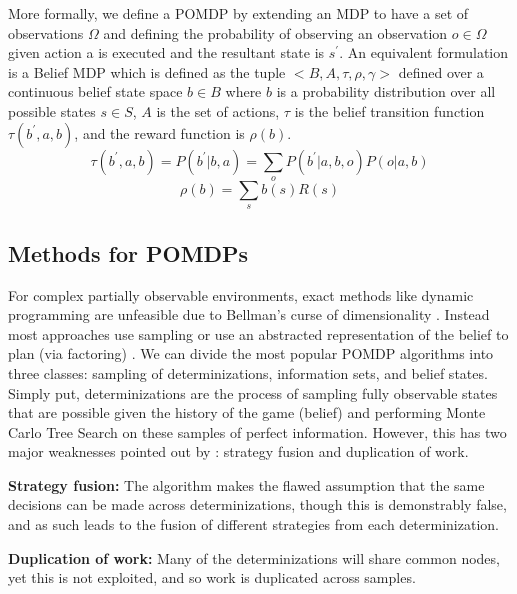 \documentclass[msc, deptreport, ai, romanprepages]{infthesis}
\begin{document}
More formally, we define a POMDP by extending an MDP to have a set of observations \(\Omega\) and defining the probability of observing an observation \(o \in \Omega\) given action a is executed and the resultant state is \(s^\prime\). An equivalent formulation is a Belief MDP which is defined as the tuple \(<B,A,\tau,\rho,\gamma>\) defined over a continuous belief state space \(b\in B\) where \(b\) is a probability distribution over all possible states \(s\in S\), \(A\) is the set of actions, \(\tau\) is the belief transition function \(\tau(b^\prime,a,b)\), and the reward function is \(\rho (b)\).
\begin{equation}
\tau(b^\prime,a,b) = P(b^\prime|b,a) = \sum_o P(b^\prime|a,b,o)P(o|a,b)
\end{equation}
\begin{equation}
\rho(b) = \sum_s b(s)R(s)
\end{equation}

\subsection{Methods for POMDPs}
For complex partially observable environments, exact methods like dynamic programming are unfeasible due to Bellman’s curse of dimensionality \cite{Mihai}. Instead most approaches use sampling or use an abstracted representation of the belief to plan (via factoring) \cite{Silver-veness} \cite{Kaebling-Lozano}. 
We can divide the most popular POMDP algorithms into three classes: sampling of determinizations, information sets, and belief states. Simply put, determinizations are the process of sampling fully observable states that are possible given the history of the game (belief) and performing Monte Carlo Tree Search on these samples of perfect information. However, this has two major weaknesses pointed out by \cite{Cowling}: strategy fusion and duplication of work. 
\begin{description}

\item \textbf{Strategy fusion:} The algorithm makes the flawed assumption that the same decisions can be made across determinizations, though this is demonstrably false, and as such leads to the fusion of different strategies from each determinization.
\item \textbf{Duplication of work:} Many of the determinizations will share common nodes, yet this is not exploited, and so work is duplicated across samples.

\end{description}
\end{document}
